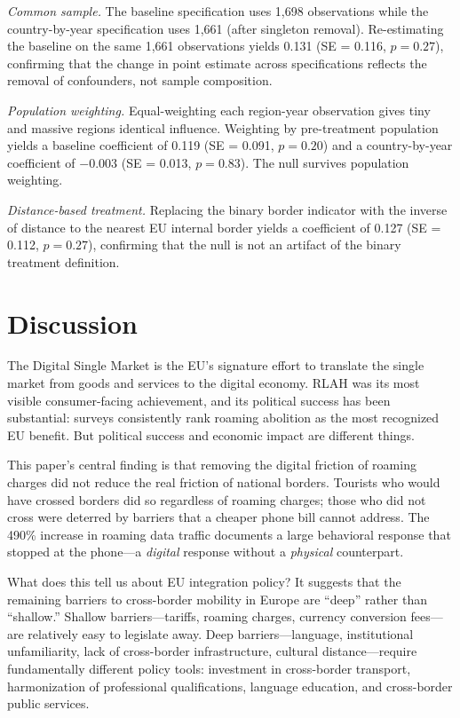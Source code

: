\documentclass[12pt]{article}
\begin{document}
\textit{Common sample.} The baseline specification uses 1,698 observations while the country-by-year specification uses 1,661 (after singleton removal). Re-estimating the baseline on the same 1,661 observations yields 0.131 (SE = 0.116, $p = 0.27$), confirming that the change in point estimate across specifications reflects the removal of confounders, not sample composition.

\textit{Population weighting.} Equal-weighting each region-year observation gives tiny and massive regions identical influence. Weighting by pre-treatment population yields a baseline coefficient of 0.119 (SE = 0.091, $p = 0.20$) and a country-by-year coefficient of $-0.003$ (SE = 0.013, $p = 0.83$). The null survives population weighting.

\textit{Distance-based treatment.} Replacing the binary border indicator with the inverse of distance to the nearest EU internal border yields a coefficient of 0.127 (SE = 0.112, $p = 0.27$), confirming that the null is not an artifact of the binary treatment definition.


\section{Discussion}

The Digital Single Market is the EU's signature effort to translate the single market from goods and services to the digital economy. RLAH was its most visible consumer-facing achievement, and its political success has been substantial: surveys consistently rank roaming abolition as the most recognized EU benefit. But political success and economic impact are different things.

This paper's central finding is that removing the digital friction of roaming charges did not reduce the real friction of national borders. Tourists who would have crossed borders did so regardless of roaming charges; those who did not cross were deterred by barriers that a cheaper phone bill cannot address. The 490\% increase in roaming data traffic documents a large behavioral response that stopped at the phone---a \textit{digital} response without a \textit{physical} counterpart.

What does this tell us about EU integration policy? It suggests that the remaining barriers to cross-border mobility in Europe are ``deep'' rather than ``shallow.'' Shallow barriers---tariffs, roaming charges, currency conversion fees---are relatively easy to legislate away. Deep barriers---language, institutional unfamiliarity, lack of cross-border infrastructure, cultural distance---require fundamentally different policy tools: investment in cross-border transport, harmonization of professional qualifications, language education, and cross-border public services.
\end{document}
